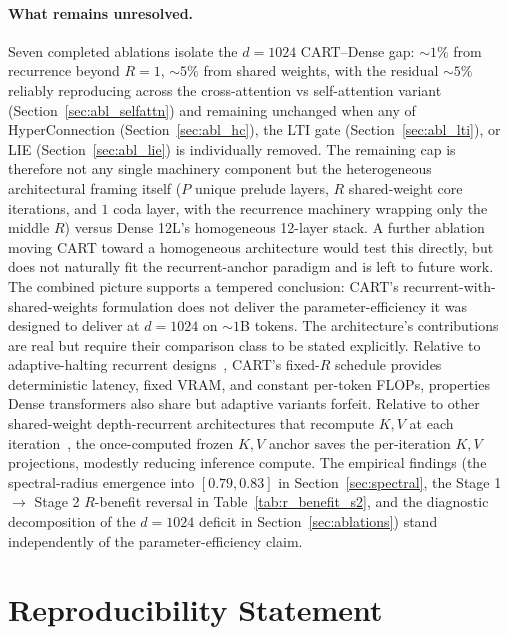 \documentclass{article}
\newcommand{\cart}{\textsc{CART}}
\begin{document}
\paragraph{What remains unresolved.}
Seven completed ablations isolate the $d{=}1024$ \cart{}--Dense gap: $\sim 1\%$ from recurrence beyond $R{=}1$, $\sim 5\%$ from shared weights, with the residual $\sim 5\%$ reliably reproducing across the cross-attention vs self-attention variant (Section~\ref{sec:abl_selfattn}) and remaining unchanged when any of HyperConnection (Section~\ref{sec:abl_hc}), the LTI gate (Section~\ref{sec:abl_lti}), or LIE (Section~\ref{sec:abl_lie}) is individually removed. The remaining cap is therefore not any single machinery component but the heterogeneous architectural framing itself ($P$ unique prelude layers, $R$ shared-weight core iterations, and $1$ coda layer, with the recurrence machinery wrapping only the middle $R$) versus Dense 12L's homogeneous 12-layer stack. A further ablation moving \cart{} toward a homogeneous architecture would test this directly, but does not naturally fit the recurrent-anchor paradigm and is left to future work. The combined picture supports a tempered conclusion: \cart{}'s recurrent-with-shared-weights formulation does not deliver the parameter-efficiency it was designed to deliver at $d{=}1024$ on $\sim 1$B tokens. The architecture's contributions are real but require their comparison class to be stated explicitly. Relative to adaptive-halting recurrent designs~\citep{dehghani2018universal,gomez2026openmythos}, \cart{}'s fixed-$R$ schedule provides deterministic latency, fixed VRAM, and constant per-token FLOPs, properties Dense transformers also share but adaptive variants forfeit. Relative to other shared-weight depth-recurrent architectures that recompute $K, V$ at each iteration~\citep{zeitoun2026hyperloop}, the once-computed frozen $K, V$ anchor saves the per-iteration $K, V$ projections, modestly reducing inference compute. The empirical findings (the spectral-radius emergence into $[0.79, 0.83]$ in Section~\ref{sec:spectral}, the Stage 1 $\to$ Stage 2 $R$-benefit reversal in Table~\ref{tab:r_benefit_s2}, and the diagnostic decomposition of the $d{=}1024$ deficit in Section~\ref{sec:ablations}) stand independently of the parameter-efficiency claim.

\section{Reproducibility Statement}
\label{sec:reproducibility_statement}
\end{document}
